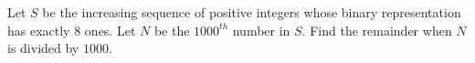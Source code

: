 Let $S$ be the increasing sequence of positive integers whose binary representation has exactly $8$ ones. Let $N$ be the $1000^{th}$ number in $S$. Find the remainder when $N$ is divided by $1000$.